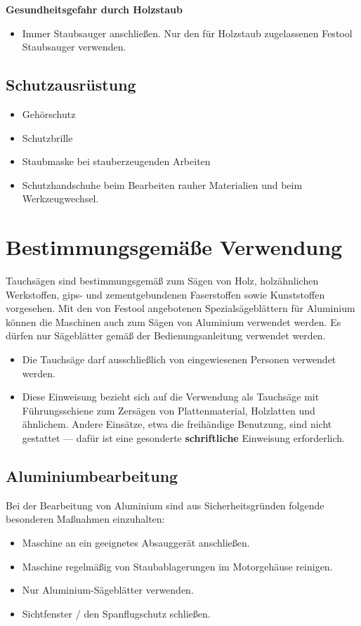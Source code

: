 \documentclass{\basedir/fablab-document}
\begin{document}
\textbf{Gesundheitsgefahr durch Holzstaub}
\begin{itemize}
	\item Immer Staubsauger anschließen. Nur den für Holzstaub zugelassenen Festool Staubsauger verwenden.
\end{itemize}

\subsection{Schutzausrüstung}

\begin{itemize}
\item Gehörschutz
\item Schutzbrille
\item Staubmaske bei stauberzeugenden Arbeiten 
\item Schutzhandschuhe beim Bearbeiten rauher Materialien und beim Werkzeugwechsel.
\end{itemize}

\section{Bestimmungsgemäße Verwendung}
Tauchsägen sind bestimmungsgemäß zum Sägen von Holz, holzähnlichen Werkstoffen, gips- und zementgebundenen Faserstoffen sowie Kunststoffen vorgesehen. Mit den von Festool angebotenen Spezialsägeblättern für Aluminium können die Maschinen auch zum Sägen von Aluminium verwendet werden. Es dürfen nur Sägeblätter gemäß der Bedienungsanleitung verwendet werden.
\begin{itemize}
\item Die Tauchsäge darf ausschließlich von eingewiesenen Personen verwendet werden.
\item Diese Einweisung bezieht sich auf die Verwendung als Tauchsäge mit Führungsschiene zum Zersägen von Plattenmaterial, Holzlatten und ähnlichem. Andere Einsätze, etwa die freihändige Benutzung, sind nicht gestattet --- dafür ist eine gesonderte \textbf{schriftliche} Einweisung erforderlich.
\end{itemize}

\subsection{Aluminiumbearbeitung}
Bei der Bearbeitung von Aluminium sind aus Sicherheitsgründen folgende besonderen Maßnahmen einzuhalten:
\begin{itemize}
\item Maschine an ein geeignetes Absauggerät anschließen.
\item Maschine regelmäßig von Staubablagerungen im Motorgehäuse reinigen.
\item Nur Aluminium-Sägeblätter verwenden.
\item Sichtfenster / den Spanflugschutz schließen.
\end{itemize}
\end{document}
